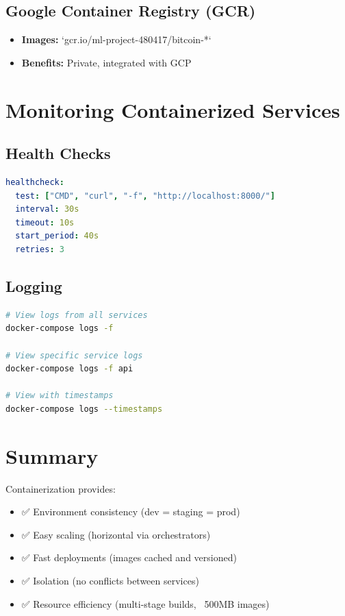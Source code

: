 \subsection{Google Container Registry (GCR)}
\begin{itemize}
    \item \textbf{Images:} `gcr.io/ml-project-480417/bitcoin-*`
    \item \textbf{Benefits:} Private, integrated with GCP
\end{itemize}

\section{Monitoring Containerized Services}

\subsection{Health Checks}

\begin{lstlisting}[language=yaml]
healthcheck:
  test: ["CMD", "curl", "-f", "http://localhost:8000/"]
  interval: 30s
  timeout: 10s
  start_period: 40s
  retries: 3
\end{lstlisting}

\subsection{Logging}

\begin{lstlisting}[language=bash]
# View logs from all services
docker-compose logs -f

# View specific service logs
docker-compose logs -f api

# View with timestamps
docker-compose logs --timestamps
\end{lstlisting}

\section{Summary}

Containerization provides:
\begin{itemize}
    \item ✅ Environment consistency (dev = staging = prod)
    \item ✅ Easy scaling (horizontal via orchestrators)
    \item ✅ Fast deployments (images cached and versioned)
    \item ✅ Isolation (no conflicts between services)
    \item ✅ Resource efficiency (multi-stage builds, ~500MB images)
\end{itemize}

